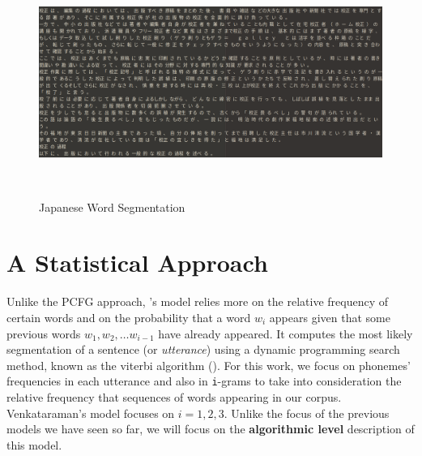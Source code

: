 \documentclass{article}
\begin{document}
\begin{figure}[h!]
  \centering
  \includegraphics[width=\columnwidth]{figures/Japanese_data.png}
  \caption{Japanese Word Segmentation}~\label{fig:figure6}
\end{figure}
\section{A Statistical Approach}

Unlike the PCFG approach, \citet{Venkataraman}'s model relies more on the relative frequency of certain words and on the probability that a word $w_i$ appears given that some previous words $w_1, w_2, \dots w_{i-1}$ have already appeared. It computes the most likely segmentation of a sentence (or \textit{utterance}) using a dynamic programming search method, known as the viterbi algorithm (\citet{viterbi}). For this work, we focus on phonemes' frequencies in each utterance and also in \texttt{i}-grams to take into consideration the relative frequency that sequences of words appearing in our corpus. Venkataraman's model focuses on $i= 1, 2, 3$. Unlike the focus of the previous models we have seen so far, we will focus on the \textbf{algorithmic level} description of this model. 
\end{document}
